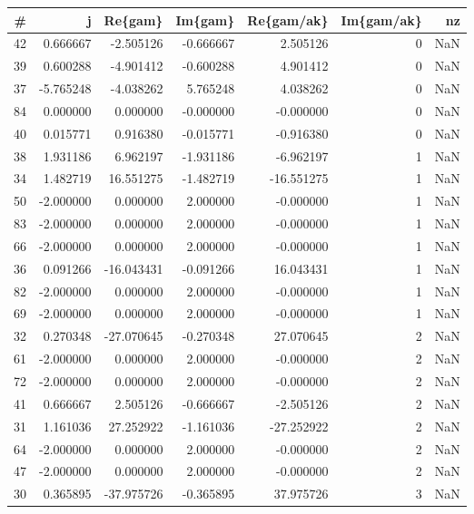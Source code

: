 \begin{tabular}{rrrrrrr}
\toprule
 \# &         j &    Re\{gam\} &   Im\{gam\} &  Re\{gam/ak\} &  Im\{gam/ak\} &  nz \\
\midrule
42 &  0.666667 &  -2.505126 & -0.666667 &    2.505126 &           0 & NaN \\
39 &  0.600288 &  -4.901412 & -0.600288 &    4.901412 &           0 & NaN \\
37 & -5.765248 &  -4.038262 &  5.765248 &    4.038262 &           0 & NaN \\
84 &  0.000000 &   0.000000 & -0.000000 &   -0.000000 &           0 & NaN \\
40 &  0.015771 &   0.916380 & -0.015771 &   -0.916380 &           0 & NaN \\
38 &  1.931186 &   6.962197 & -1.931186 &   -6.962197 &           1 & NaN \\
34 &  1.482719 &  16.551275 & -1.482719 &  -16.551275 &           1 & NaN \\
50 & -2.000000 &   0.000000 &  2.000000 &   -0.000000 &           1 & NaN \\
83 & -2.000000 &   0.000000 &  2.000000 &   -0.000000 &           1 & NaN \\
66 & -2.000000 &   0.000000 &  2.000000 &   -0.000000 &           1 & NaN \\
36 &  0.091266 & -16.043431 & -0.091266 &   16.043431 &           1 & NaN \\
82 & -2.000000 &   0.000000 &  2.000000 &   -0.000000 &           1 & NaN \\
69 & -2.000000 &   0.000000 &  2.000000 &   -0.000000 &           1 & NaN \\
32 &  0.270348 & -27.070645 & -0.270348 &   27.070645 &           2 & NaN \\
61 & -2.000000 &   0.000000 &  2.000000 &   -0.000000 &           2 & NaN \\
72 & -2.000000 &   0.000000 &  2.000000 &   -0.000000 &           2 & NaN \\
41 &  0.666667 &   2.505126 & -0.666667 &   -2.505126 &           2 & NaN \\
31 &  1.161036 &  27.252922 & -1.161036 &  -27.252922 &           2 & NaN \\
64 & -2.000000 &   0.000000 &  2.000000 &   -0.000000 &           2 & NaN \\
47 & -2.000000 &   0.000000 &  2.000000 &   -0.000000 &           2 & NaN \\
30 &  0.365895 & -37.975726 & -0.365895 &   37.975726 &           3 & NaN \\

\end{tabular}
